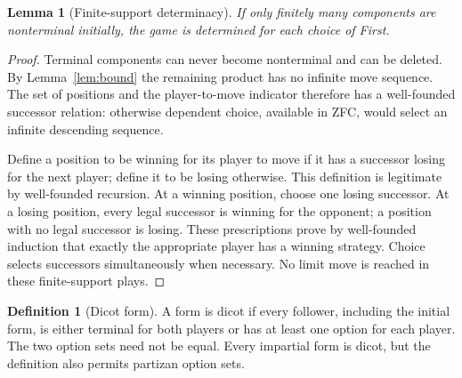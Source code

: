 \documentclass[11pt,a4paper]{article}
\newtheorem{lemma}[theorem]{Lemma}
\theoremstyle{definition}\newtheorem{definition}[theorem]{Definition}
\theoremstyle{remark}\newtheorem{remark}[theorem]{Remark}
\newcommand{\1}{\mathbf 1}
\begin{document}
\begin{lemma}[Finite-support determinacy]\label{lem:finite}
If only finitely many components are nonterminal initially, the game is determined for each choice of First.
\end{lemma}
\begin{proof}
Terminal components can never become nonterminal and can be deleted. By Lemma~\ref{lem:bound} the remaining product has no infinite move sequence. The set of positions and the player-to-move indicator therefore has a well-founded successor relation: otherwise dependent choice, available in ZFC, would select an infinite descending sequence.

Define a position to be winning for its player to move if it has a successor losing for the next player; define it to be losing otherwise. This definition is legitimate by well-founded recursion. At a winning position, choose one losing successor. At a losing position, every legal successor is winning for the opponent; a position with no legal successor is losing. These prescriptions prove by well-founded induction that exactly the appropriate player has a winning strategy. Choice selects successors simultaneously when necessary. No limit move is reached in these finite-support plays.
\end{proof}

\begin{definition}[Dicot form]
A form is dicot if every follower, including the initial form, is either terminal for both players or has at least one option for each player. The two option sets need not be equal. Every impartial form is dicot, but the definition also permits partizan option sets.
\end{definition}
\end{document}
